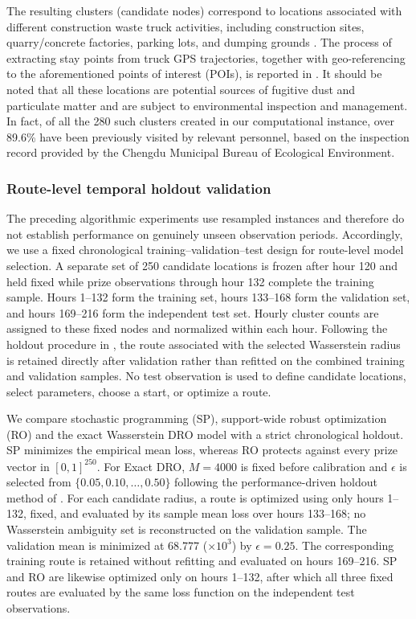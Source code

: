\documentclass[preprint,12pt,authoryear]{elsarticle}
\theoremstyle{definition}
\begin{document}
The resulting clusters (candidate nodes) correspond to locations associated with different construction waste truck activities, including construction sites, quarry/concrete factories, parking lots, and dumping grounds \citep{yu2025using}. The process of extracting stay points from truck GPS trajectories, together with geo-referencing to the aforementioned points of interest (POIs), is reported in \citet{MA2026}. It should be noted that all these locations are potential sources of fugitive dust and particulate matter and are subject to environmental inspection and management. In fact, of all the 280 such clusters created in our computational instance, over 89.6\% have been previously visited by relevant personnel, based on the inspection record provided by the Chengdu Municipal Bureau of Ecological Environment. 

{






\subsubsection{Route-level temporal holdout validation}
\label{sec:temporal_holdout}

The preceding algorithmic experiments use resampled instances and therefore do not establish performance on genuinely unseen observation periods. Accordingly, we use a fixed chronological training--validation--test design for route-level model selection. A separate set of 250 candidate locations is frozen after hour 120 and held fixed while prize observations through hour 132 complete the training sample. Hours 1--132 form the training set, hours 133--168 form the validation set, and hours 169--216 form the independent test set. Hourly cluster counts are assigned to these fixed nodes and normalized within each hour. Following the holdout procedure in \citet{mohajerin2018data}, the route associated with the selected Wasserstein radius is retained directly after validation rather than refitted on the combined training and validation samples. No test observation is used to define candidate locations, select parameters, choose a start, or optimize a route.

We compare stochastic programming (SP), support-wide robust optimization (RO) and the exact Wasserstein DRO model with a strict chronological holdout. 
SP minimizes the empirical mean loss, whereas RO protects against every prize vector in $[0,1]^{250}$. For Exact DRO, $M=4000$ is fixed before calibration and $\epsilon$ is selected from $\{0.05,0.10,\ldots,0.50\}$ following the performance-driven holdout method of \citet{mohajerin2018data}. For each candidate radius, a route is optimized using only hours 1--132, fixed, and evaluated by its sample mean loss over hours 133--168; no Wasserstein ambiguity set is reconstructed on the validation sample. The validation mean is minimized at 68.777 ($\times10^3$) by $\epsilon=0.25$. The corresponding training route is retained without refitting and evaluated on hours 169--216. SP and RO are likewise optimized only on hours 1--132, after which all three fixed routes are evaluated by the same loss function on the independent test observations.

}
\end{document}
